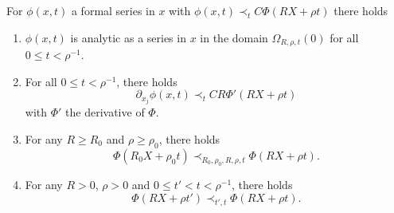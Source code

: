 \documentclass[AHL,Unicode,longabstracts,published]{cedram}
\theoremstyle{plain}
\newcommand{\dptl}{\partial}%
\begin{document}
\begin{lemm}\label{1.lemma.phi.prec.Phi}
For $\phi(x,t)$ a formal series in $x$ with $ \phi(x,t) \prec_{t} C\Phi(R X + \rho t) $ there holds
\begin{enumerate}
\item \label{lem4.4.1}$\phi(x,t)$ is analytic as a series in $x$ in the domain $\Omega_{R,\rho,t}(0)$ for all $0\leq t < \rho^{-1}$.

\item \label{lem4.4.2}For all $0\leq t < \rho^{-1}$, there holds
\begin{equation}\label{1.dx.Phi}
\dptl_{x_j} \phi(x,t) \prec_{t} CR \Phi'(R X + \rho t)
\end{equation}
with $\Phi'$ the derivative of $\Phi$.

\item \label{lem4.4.3}For any $R \geq R_0$ and $\rho \geq \rho_0$, there holds
\begin{equation}\label{1.R_0.R}
\Phi(R_0X+\rho_0 t) \prec_{R_0,\rho_0,R,\rho,t} \Phi(RX+\rho t).
\end{equation}

\item \label{lem4.4.4}For any $R>0$, $\rho>0$ and $0 \leq t' < t < \rho^{-1}$, there holds
\begin{equation}\label{1.t'.t}
\Phi(RX + \rho t') \prec_{t',t} \Phi(RX + \rho t).
\end{equation}
\end{enumerate}
\end{lemm}
\end{document}
